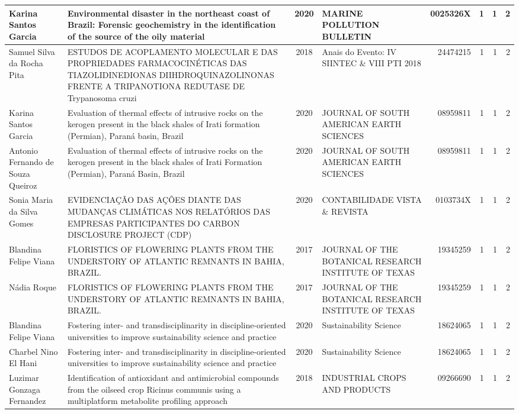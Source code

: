 \documentclass[12pt,brazil]{article}\usepackage[]{graphicx}\usepackage[]{xcolor}
\begin{document}
\begin{longtable}{|E{3cm}|E{6cm}|c|E{5cm}|r|r|r|r|}
\hline
Karina Santos Garcia & Environmental disaster in the northeast coast of Brazil: Forensic geochemistry in the identification of the source of the oily material & 2020 & MARINE POLLUTION BULLETIN & 0025326X & 1 & 1 & 2 \\
\hline
Samuel Silva da Rocha Pita & ESTUDOS DE ACOPLAMENTO MOLECULAR E DAS PROPRIEDADES FARMACOCINÉTICAS DAS TIAZOLIDINEDIONAS DIIHDROQUINAZOLINONAS FRENTE A TRIPANOTIONA REDUTASE DE Trypanosoma cruzi & 2018 & Anais do Evento: IV SIINTEC \& VIII PTI 2018 & 24474215 & 1 & 1 & 2 \\
\hline
Karina Santos Garcia & Evaluation of thermal effects of intrusive rocks on the kerogen present in the black shales of Irati formation (Permian), Paraná basin, Brazil & 2020 & JOURNAL OF SOUTH AMERICAN EARTH SCIENCES & 08959811 & 1 & 1 & 2 \\
\hline
Antonio Fernando de Souza Queiroz & Evaluation of thermal effects of intrusive rocks on the kerogen present in the black shales of Irati Formation (Permian), Paraná Basin, Brazil & 2020 & JOURNAL OF SOUTH AMERICAN EARTH SCIENCES & 08959811 & 1 & 1 & 2 \\
\hline
Sonia Maria da Silva Gomes & EVIDENCIAÇÃO DAS AÇÕES DIANTE DAS MUDANÇAS CLIMÁTICAS NOS RELATÓRIOS DAS EMPRESAS PARTICIPANTES DO CARBON DISCLOSURE PROJECT (CDP) & 2020 & CONTABILIDADE VISTA \& REVISTA & 0103734X & 1 & 1 & 2 \\
\hline
Blandina Felipe Viana & FLORISTICS OF FLOWERING PLANTS FROM THE UNDERSTORY OF ATLANTIC REMNANTS IN BAHIA, BRAZIL. & 2017 & JOURNAL OF THE BOTANICAL RESEARCH INSTITUTE OF TEXAS & 19345259 & 1 & 1 & 2 \\
\hline
Nádia Roque & FLORISTICS OF FLOWERING PLANTS FROM THE UNDERSTORY OF ATLANTIC REMNANTS IN BAHIA, BRAZIL. & 2017 & JOURNAL OF THE BOTANICAL RESEARCH INSTITUTE OF TEXAS & 19345259 & 1 & 1 & 2 \\
\hline
Blandina Felipe Viana & Fostering inter- and transdisciplinarity in discipline-oriented universities to improve sustainability science and practice & 2020 & Sustainability Science & 18624065 & 1 & 1 & 2 \\
\hline
Charbel Nino El Hani & Fostering inter- and transdisciplinarity in discipline-oriented universities to improve sustainability science and practice & 2020 & Sustainability Science & 18624065 & 1 & 1 & 2 \\
\hline
Luzimar Gonzaga Fernandez & Identification of antioxidant and antimicrobial compounds from the oilseed crop Ricinus communis using a multiplatform metabolite profiling approach & 2018 & INDUSTRIAL CROPS AND PRODUCTS & 09266690 & 1 & 1 & 2 \\

\end{longtable}
\end{document}

